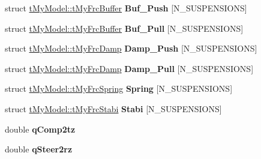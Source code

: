 \begin{DoxyCompactItemize}
\begin{tabbing}
\end{tabbing}\item 
\mbox{\label{structt_my_model_afc60d337ab1cafd674eea6b7ea554e7c}} 
struct \mbox{\hyperlink{structt_my_model_1_1t_my_frc_buffer}{t\+My\+Model\+::t\+My\+Frc\+Buffer}} {\bfseries Buf\+\_\+\+Push} \mbox{[}N\+\_\+\+S\+U\+S\+P\+E\+N\+S\+I\+O\+NS\mbox{]}
\item 
\mbox{\label{structt_my_model_a48b4fb475c699d6d3570fb0bc51b4c29}} 
struct \mbox{\hyperlink{structt_my_model_1_1t_my_frc_buffer}{t\+My\+Model\+::t\+My\+Frc\+Buffer}} {\bfseries Buf\+\_\+\+Pull} \mbox{[}N\+\_\+\+S\+U\+S\+P\+E\+N\+S\+I\+O\+NS\mbox{]}
\item 
\mbox{\label{structt_my_model_a18904cfcda6c9a4903bab9fa1008e338}} 
struct \mbox{\hyperlink{structt_my_model_1_1t_my_frc_damp}{t\+My\+Model\+::t\+My\+Frc\+Damp}} {\bfseries Damp\+\_\+\+Push} \mbox{[}N\+\_\+\+S\+U\+S\+P\+E\+N\+S\+I\+O\+NS\mbox{]}
\item 
\mbox{\label{structt_my_model_ad90c0ac20ed11360f9d2b9623ecd2773}} 
struct \mbox{\hyperlink{structt_my_model_1_1t_my_frc_damp}{t\+My\+Model\+::t\+My\+Frc\+Damp}} {\bfseries Damp\+\_\+\+Pull} \mbox{[}N\+\_\+\+S\+U\+S\+P\+E\+N\+S\+I\+O\+NS\mbox{]}
\item 
\mbox{\label{structt_my_model_a0a10e472ca2215f7f8e6b69817d86313}} 
struct \mbox{\hyperlink{structt_my_model_1_1t_my_frc_spring}{t\+My\+Model\+::t\+My\+Frc\+Spring}} {\bfseries Spring} \mbox{[}N\+\_\+\+S\+U\+S\+P\+E\+N\+S\+I\+O\+NS\mbox{]}
\item 
\mbox{\label{structt_my_model_a6bab3942bc4d0c0b7deda850f9df4f04}} 
struct \mbox{\hyperlink{structt_my_model_1_1t_my_frc_stabi}{t\+My\+Model\+::t\+My\+Frc\+Stabi}} {\bfseries Stabi} \mbox{[}N\+\_\+\+S\+U\+S\+P\+E\+N\+S\+I\+O\+NS\mbox{]}
\item 
\mbox{\label{structt_my_model_af5be5a99441ad32f290d87249c9e71ba}} 
double {\bfseries q\+Comp2tz}
\item 
\mbox{\label{structt_my_model_a1775cb74984dafd6c6f8b8c98dfa5a87}} 
double {\bfseries q\+Steer2rz}
\item 

\end{DoxyCompactItemize}

